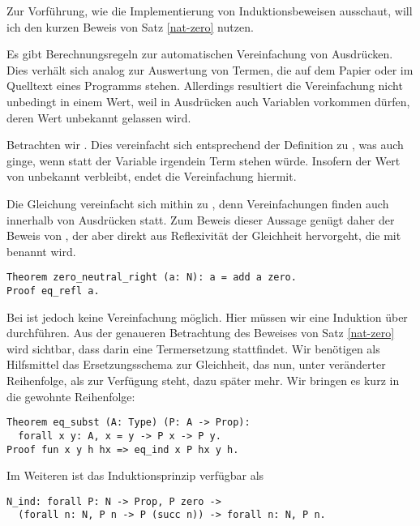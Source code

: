 \noindent
Zur Vorführung, wie die Implementierung von Induktionsbeweisen ausschaut,
will ich den kurzen Beweis von Satz \ref{nat-zero} nutzen.

Es gibt Berechnungsregeln zur automatischen Vereinfachung von Ausdrücken.
Dies verhält sich analog zur Auswertung von Termen, die auf dem Papier
oder im Quelltext eines Programms stehen. Allerdings resultiert die
Vereinfachung nicht unbedingt in einem Wert, weil in Ausdrücken auch
Variablen vorkommen dürfen, deren Wert unbekannt gelassen wird.

Betrachten wir . Dies vereinfacht sich entsprechend
der Definition zu , was auch ginge, wenn statt der Variable
 irgendein Term stehen würde. Insofern der Wert von 
unbekannt verbleibt, endet die Vereinfachung hiermit.

Die Gleichung  vereinfacht sich mithin zu ,
denn Vereinfachungen finden auch innerhalb von Ausdrücken statt.
Zum Beweis dieser Aussage genügt daher der Beweis von ,
der aber direkt aus Reflexivität der Gleichheit hervorgeht, die mit
 benannt wird.

\begin{lstlisting}[language=Coq, xleftmargin=\mathindent]
Theorem zero_neutral_right (a: N): a = add a zero.
Proof eq_refl a.
\end{lstlisting}

\noindent
Bei  ist jedoch keine Vereinfachung möglich. Hier müssen
wir eine Induktion über  durchführen. Aus der genaueren Betrachtung
des Beweises von Satz \ref{nat-zero} wird sichtbar, dass darin eine Termersetzung
stattfindet. Wir benötigen als Hilfsmittel das Ersetzungsschema zur
Gleichheit, das nun, unter veränderter Reihenfolge, als 
zur Verfügung steht, dazu später mehr. Wir bringen es kurz in die
gewohnte Reihenfolge:

\begin{lstlisting}[language=Coq, xleftmargin=\mathindent]
Theorem eq_subst (A: Type) (P: A -> Prop):
  forall x y: A, x = y -> P x -> P y.
Proof fun x y h hx => eq_ind x P hx y h.
\end{lstlisting}

\noindent
Im Weiteren ist das Induktionsprinzip verfügbar als

\begin{lstlisting}[language=Coq, xleftmargin=\mathindent]
N_ind: forall P: N -> Prop, P zero ->
  (forall n: N, P n -> P (succ n)) -> forall n: N, P n.
\end{lstlisting}

